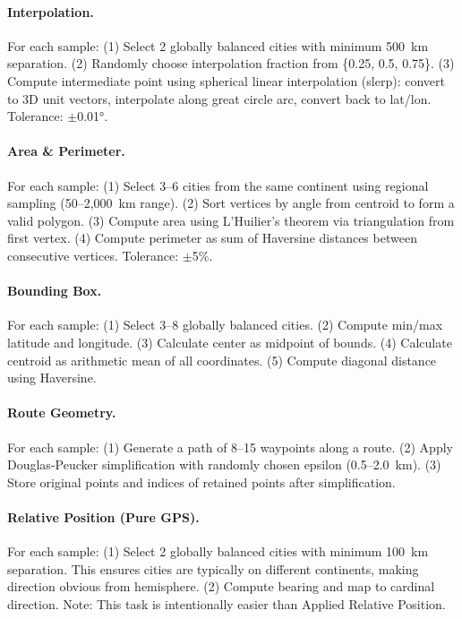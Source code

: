 \paragraph{Interpolation.}
For each sample: (1) Select 2 globally balanced cities with minimum 500~km separation. (2) Randomly choose interpolation fraction from \{0.25, 0.5, 0.75\}. (3) Compute intermediate point using spherical linear interpolation (slerp): convert to 3D unit vectors, interpolate along great circle arc, convert back to lat/lon. Tolerance: $\pm$0.01°.

\paragraph{Area \& Perimeter.}
For each sample: (1) Select 3--6 cities from the same continent using regional sampling (50--2,000~km range). (2) Sort vertices by angle from centroid to form a valid polygon. (3) Compute area using L'Huilier's theorem via triangulation from first vertex. (4) Compute perimeter as sum of Haversine distances between consecutive vertices. Tolerance: $\pm$5\%.

\paragraph{Bounding Box.}
For each sample: (1) Select 3--8 globally balanced cities. (2) Compute min/max latitude and longitude. (3) Calculate center as midpoint of bounds. (4) Calculate centroid as arithmetic mean of all coordinates. (5) Compute diagonal distance using Haversine.

\paragraph{Route Geometry.}
For each sample: (1) Generate a path of 8--15 waypoints along a route. (2) Apply Douglas-Peucker simplification with randomly chosen epsilon (0.5--2.0~km). (3) Store original points and indices of retained points after simplification.

\paragraph{Relative Position (Pure GPS).}
For each sample: (1) Select 2 globally balanced cities with minimum 100~km separation. This ensures cities are typically on different continents, making direction obvious from hemisphere. (2) Compute bearing and map to cardinal direction. Note: This task is intentionally easier than Applied Relative Position.

